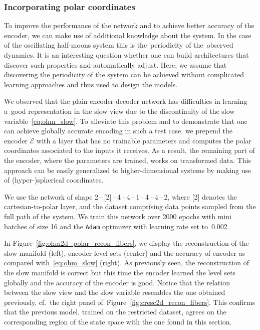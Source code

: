 \documentclass{article}
\newcommand{\enc}{\mathcal{E}} %
\begin{document}
\subsubsection{Incorporating polar coordinates}\label{sec:ohm_polar}
To improve the performance of the network and to achieve better accuracy of the encoder, we can make use of additional knowledge about the system. In the case of the oscillating half-moons system this is the~periodicity of the~observed dynamics. It is an interesting question whether one can build architectures that discover such properties and automatically adjust. Here, we assume that discovering the periodicity of the system can be achieved without complicated learning approaches and thus used to design the models.

We observed that the plain encoder-decoder network has difficulties in learning a~good representation in the slow view due to the discontinuity of the slow variable~\eqref{eq:ohm_slow}. To alleviate this problem and to demonstrate that one can achieve globally accurate encoding in such a test case, we prepend the encoder $\enc$ with a layer that has no trainable parameters and computes the polar coordinates associated to the inputs it receives. As a result, the remaining part of the encoder, where the parameters are trained, works on transformed data. This approach can be easily generalized to higher-dimensional systems by making use of (hyper-)spherical coordinates.

We use the network of shape 2\,--\,[2]\,--\,4\,--\,4\,--\,1\,--\,4\,--\,4\,--\,2, where [2] denotes the cartesian-to-polar layer, and the dataset comprising data points sampled from the full path of the system. We train this network over 2000 epochs with mini batches of size 16 and the \texttt{Adam} optimizer with learning rate set to~0.002.

In Figure~\ref{fig:ohm2d_polar_recon_fibers}, we display the reconstruction of the slow manifold (left), encoder level sets (center) and the accuracy of encoder as compared with~\eqref{eq:ohm_slow} (right). As previously seen, the reconstruction of the slow manifold is correct but this time the encoder learned the level sets globally and the accuracy of the encoder is good. Notice that the relation between the slow view and the slow variable resembles the one obtained previously, cf.~the right panel of~Figure~\ref{fig:cresc2d_recon_fibers}. This confirms that the previous model, trained on the restricted dataset, agrees on the corresponding region of the state space with the one found in this section.
\end{document}
